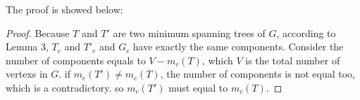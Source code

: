 \noindent The proof is showed below:
\begin{proof}
Because $T$ and $T'$ are two minimum spanning trees of $G$, according to Lemma 3, $T_{c}$ and $T'_{c}$ and $G_{c}$ have exactly the same components. Consider the number of components equals to $V - m_c(T)$, which $V$ is the total number of vertexs in $G$. if $m_c(T') \neq m_c(T)$, the number of components is not equal too, which is a contradictory. so $m_c(T')$ must equal to $m_c(T)$.
\end{proof}
